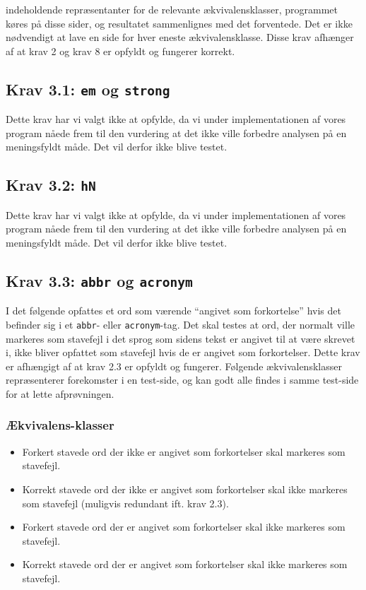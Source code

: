 \documentclass[a4paper,oneside,article]{memoir}
\begin{document}
\begin{landscape}
  indeholdende repræsentanter for de relevante ækvivalensklasser,
programmet køres på disse sider, og resultatet sammenlignes med det
forventede. Det er ikke nødvendigt at lave en side for hver eneste
ækvivalensklasse. Disse krav afhænger af at krav 2 og krav 8 er
opfyldt og fungerer korrekt.

\subsection{Krav 3.1: \texttt{em} og \texttt{strong}}

Dette krav har vi valgt ikke at opfylde, da vi under implementationen
af vores program nåede frem til den vurdering at det ikke ville
forbedre analysen på en meningsfyldt måde. Det vil derfor ikke blive
testet.

\subsection{Krav 3.2: \texttt{hN}}

Dette krav har vi valgt ikke at opfylde, da vi under implementationen
af vores program nåede frem til den vurdering at det ikke ville
forbedre analysen på en meningsfyldt måde. Det vil derfor ikke blive
testet.

\subsection{Krav 3.3: \texttt{abbr} og \texttt{acronym}}

I det følgende opfattes et ord som værende ``angivet som forkortelse''
hvis det befinder sig i et \texttt{abbr}- eller
\texttt{acronym}-tag. Det skal testes at ord, der normalt ville
markeres som stavefejl i det sprog som sidens tekst er angivet til at
være skrevet i, ikke bliver opfattet som stavefejl hvis de er angivet
som forkortelser. Dette krav er afhængigt af at krav 2.3 er opfyldt og
fungerer. Følgende ækvivalensklasser repræsenterer forekomster i en
test-side, og kan godt alle findes i samme test-side for at lette
afprøvningen.

\subsubsection{Ækvivalens-klasser}
\begin{itemize}
\item Forkert stavede ord der ikke er angivet som forkortelser skal
  markeres som stavefejl.
\item Korrekt stavede ord der ikke er angivet som forkortelser skal
  ikke markeres som stavefejl (muligvis redundant ift. krav 2.3).
\item Forkert stavede ord der er angivet som forkortelser skal ikke
  markeres som stavefejl.
\item Korrekt stavede ord der er angivet som forkortelser skal ikke
  markeres som stavefejl.
\end{itemize}


\end{landscape}
\end{document}
